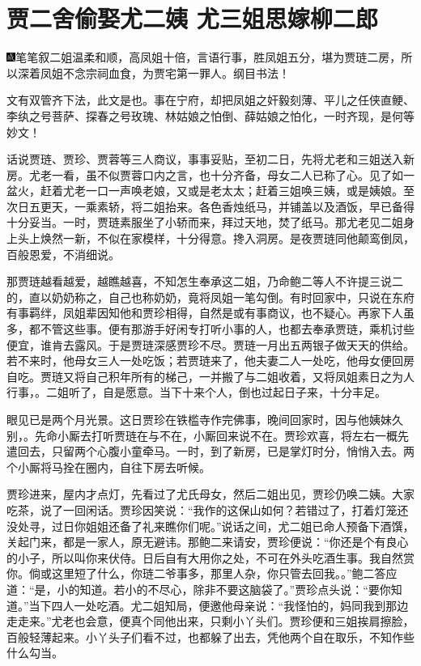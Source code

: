
\chapter{贾二舍偷娶尤二姨 尤三姐思嫁柳二郎}
{\includegraphics[width=3mm]{../Images/00005}\kaishu 笔笔叙二姐温柔和顺，高凤姐十倍，言语行事，胜凤姐五分，堪为贾琏二房，所以深着凤姐不念宗祠血食，为贾宅第一罪人。纲目书法！}

{\kaishu 文有双管齐下法，此文是也。事在宁府，却把凤姐之奸毅刻薄、平儿之任侠直鲠、李纨之号菩萨、探春之号玫瑰、林姑娘之怕倒、薛姑娘之怕化，一时齐现，是何等妙文！}

话说贾琏、贾珍、贾蓉等三人商议，事事妥贴，至初二日，先将尤老和三姐送入新房。尤老一看，虽不似贾蓉口内之言，也十分齐备，母女二人已称了心。见了如一盆火，赶着尤老一口一声唤老娘，又或是老太太；赶着三姐唤三姨，或是姨娘。至次日五更天，一乘素轿，将二姐抬来。各色香烛纸马，并铺盖以及酒饭，早已备得十分妥当。一时，贾琏素服坐了小轿而来，拜过天地，焚了纸马。那尤老见二姐身上头上焕然一新，不似在家模样，十分得意。搀入洞房。是夜贾琏同他颠鸾倒凤，百般恩爱，不消细说。

那贾琏越看越爱，越瞧越喜，不知怎生奉承这二姐，乃命鲍二等人不许提三说二的，直以奶奶称之，自己也称奶奶，竟将凤姐一笔勾倒。有时回家中，只说在东府有事羁绊，凤姐辈因知他和贾珍相得，自然是或有事商议，也不疑心。再家下人虽多，都不管这些事。便有那游手好闲专打听小事的人，也都去奉承贾琏，乘机讨些便宜，谁肯去露风。于是贾琏深感贾珍不尽。贾琏一月出五两银子做天天的供给。若不来时，他母女三人一处吃饭；若贾琏来了，他夫妻二人一处吃，他母女便回房自吃。贾琏又将自己积年所有的梯己，一并搬了与二姐收着，又将凤姐素日之为人行事，。二姐听了，自是愿意。当下十来个人，倒也过起日子来，十分丰足。

眼见已是两个月光景。这日贾珍在铁槛寺作完佛事，晚间回家时，因与他姨妹久别，。先命小厮去打听贾琏在与不在，小厮回来说不在。贾珍欢喜，将左右一概先遣回去，只留两个心腹小童牵马。一时，到了新房，已是掌灯时分，悄悄入去。两个小厮将马拴在圈内，自往下房去听候。

贾珍进来，屋内才点灯，先看过了尤氏母女，然后二姐出见，贾珍仍唤二姨。大家吃茶，说了一回闲话。贾珍因笑说：``我作的这保山如何？若错过了，打着灯笼还没处寻，过日你姐姐还备了礼来瞧你们呢。''说话之间，尤二姐已命人预备下酒馔，关起门来，都是一家人，原无避讳。那鲍二来请安，贾珍便说：``你还是个有良心的小子，所以叫你来伏侍。日后自有大用你之处，不可在外头吃酒生事。我自然赏你。倘或这里短了什么，你琏二爷事多，那里人杂，你只管去回我。。''鲍二答应道：``是，小的知道。若小的不尽心，除非不要这脑袋了。''贾珍点头说：``要你知道。''当下四人一处吃酒。尤二姐知局，便邀他母亲说：``我怪怕的，妈同我到那边走走来。''尤老也会意，便真个同他出来，只剩小丫头们。贾珍便和三姐挨肩擦脸，百般轻薄起来。小丫头子们看不过，也都躲了出去，凭他两个自在取乐，不知作些什么勾当。

